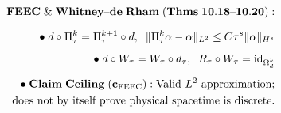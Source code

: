 \documentclass[preview]{standalone}
\begin{document}
\begin{align*}
\special{dvisvgm:raw <g id='unique000'>}\mathbf{FEEC\;\&\;Whitney\text{--}de\;Rham\;(Thms\;10.18\text{--}10.20):}\\[6pt]\bullet\;d \circ \Pi_\tau^k = \Pi_\tau^{k+1}\circ d, \;\; \|\Pi_\tau^k\alpha - \alpha\|_{L^2} \le C\tau^s\|\alpha\|_{H^s}\\[5pt]\bullet\;d \circ W_\tau = W_\tau \circ d_\tau, \;\; R_\tau \circ W_\tau = \operatorname{id}_{\Omega_d^k}\\[5pt]\bullet\;\mathbf{Claim\;Ceiling\;(c_{\mathrm{FEEC}}):}\;\text{Valid }L^2\text{ approximation;}\\\;\;\text{does not by itself prove physical spacetime is discrete.}\special{dvisvgm:raw </g>}
\end{align*}
\end{document}
